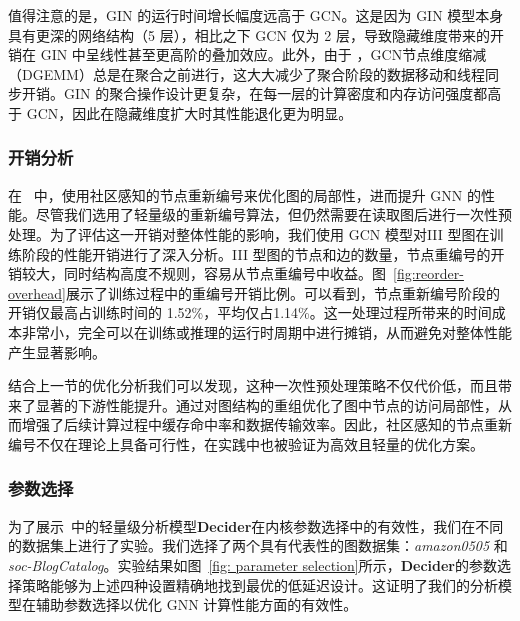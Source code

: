 值得注意的是，GIN 的运行时间增长幅度远高于 GCN。这是因为 GIN 模型本身具有更深的网络结构（5 层），相比之下 GCN 仅为 2 层，导致隐藏维度带来的开销在 GIN 中呈线性甚至更高阶的叠加效应。此外，由于 ，GCN节点维度缩减（DGEMM）总是在聚合之前进行，这大大减少了聚合阶段的数据移动和线程同步开销。GIN 的聚合操作设计更复杂，在每一层的计算密度和内存访问强度都高于 GCN，因此在隐藏维度扩大时其性能退化更为明显。

\subsubsection{开销分析}
在 ~\Mname{}中，使用社区感知的节点重新编号来优化图的局部性，进而提升 GNN 的性能。尽管我们选用了轻量级的重新编号算法，但仍然需要在读取图后进行一次性预处理。为了评估这一开销对整体性能的影响，我们使用 GCN 模型对III 型图在训练阶段的性能开销进行了深入分析。III 型图的节点和边的数量，节点重编号的开销较大，同时结构高度不规则，容易从节点重编号中收益。图~\ref{fig:reorder-overhead}展示了训练过程中的重编号开销比例。可以看到，节点重新编号阶段的开销仅最高占训练时间的 1.52\%，平均仅占1.14\%。这一处理过程所带来的时间成本非常小，完全可以在训练或推理的运行时周期中进行摊销，从而避免对整体性能产生显著影响。

结合上一节的优化分析我们可以发现，这种一次性预处理策略不仅代价低，而且带来了显著的下游性能提升。通过对图结构的重组优化了图中节点的访问局部性，从而增强了后续计算过程中缓存命中率和数据传输效率。因此，社区感知的节点重新编号不仅在理论上具备可行性，在实践中也被验证为高效且轻量的优化方案。
\subsubsection{参数选择}

为了展示~\Mname{}中的轻量级分析模型\textbf{Decider}在内核参数选择中的有效性，我们在不同的数据集上进行了实验。我们选择了两个具有代表性的图数据集：\textit{amazon0505} 和 \textit{soc-BlogCatalog}。实验结果如图~\ref{fig: parameter selection}所示，\textbf{Decider}的参数选择策略能够为上述四种设置精确地找到最优的低延迟设计。这证明了我们的分析模型在辅助参数选择以优化 GNN 计算性能方面的有效性。

